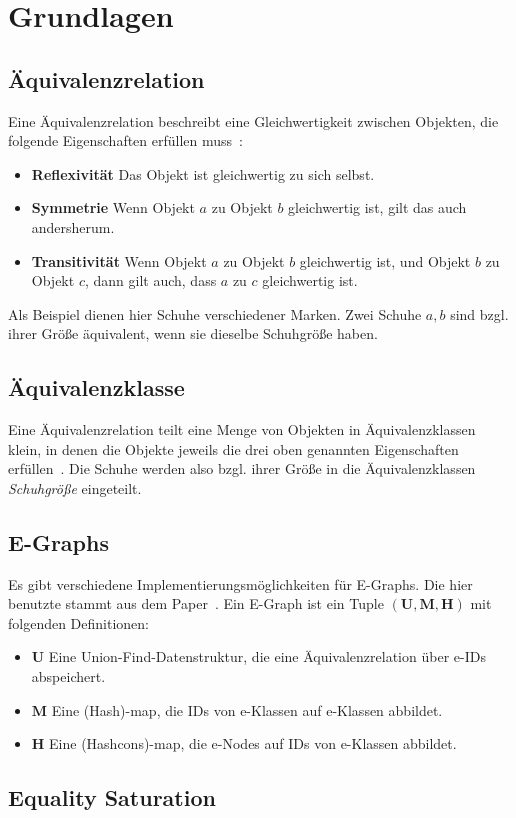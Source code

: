 \section{Grundlagen}\label{sec:grundlagen}


\subsection{Äquivalenzrelation}

Eine Äquivalenzrelation beschreibt eine Gleichwertigkeit zwischen Objekten, die folgende Eigenschaften erfüllen muss~\cite{Ehrig2001}:

\begin{itemize}
  \item \textbf{Reflexivität} Das Objekt ist gleichwertig zu sich selbst.
  \item \textbf{Symmetrie} Wenn Objekt $a$ zu Objekt $b$ gleichwertig ist, gilt das auch andersherum.
  \item \textbf{Transitivität} Wenn Objekt $a$ zu Objekt $b$ gleichwertig ist, und Objekt $b$ zu Objekt $c$, dann gilt auch, dass $a$ zu $c$ gleichwertig ist.
\end{itemize}

Als Beispiel dienen hier Schuhe verschiedener Marken. Zwei Schuhe $a, b$ sind bzgl. ihrer Größe äquivalent, wenn sie dieselbe Schuhgröße haben. 

\subsection{Äquivalenzklasse}

Eine Äquivalenzrelation teilt eine Menge von Objekten in Äquivalenzklassen klein, in denen die Objekte jeweils die drei oben genannten Eigenschaften erfüllen~\cite{Ehrig2001}.
Die Schuhe werden also bzgl. ihrer Größe in die Äquivalenzklassen \textit{Schuhgröße} eingeteilt.

\subsection{E-Graphs}


Es gibt verschiedene Implementierungsmöglichkeiten für E-Graphs. Die hier benutzte stammt aus dem Paper~\cite{2021-egg}.
Ein E-Graph ist ein Tuple $(\mathbf{U}, \mathbf{M}, \mathbf{H})$ mit folgenden Definitionen:

\begin{itemize}
  \item $\mathbf{U}$ Eine Union-Find-Datenstruktur, die eine Äquivalenzrelation über e-IDs abspeichert.
  \item $\mathbf{M}$ Eine (Hash)-map, die IDs von e-Klassen auf e-Klassen abbildet. 
  \item $\mathbf{H}$ Eine (Hashcons)-map, die e-Nodes auf IDs von e-Klassen abbildet.
\end{itemize}

\subsection{Equality Saturation}

